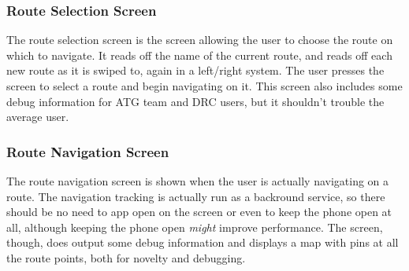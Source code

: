 \subsubsection{Route Selection Screen}
The route selection screen is the screen allowing the user to choose the route on which to navigate. It reads off the name of the current
route, and reads off each new route as it is swiped to, again in a left/right system. The user presses the screen to select a route and begin
navigating on it. This screen also includes some debug information for ATG team and DRC users, but it shouldn't trouble the average user.

\subsubsection{Route Navigation Screen}
The route navigation screen is shown when the user is actually navigating on a route. The navigation tracking is actually run as a backround
service, so there should be no need to app open on the screen or even to keep the phone open at all, although keeping the phone open
\emph{might} improve performance. The screen, though, does output some debug information and displays a map with pins at all the route points,
both for novelty and debugging.
